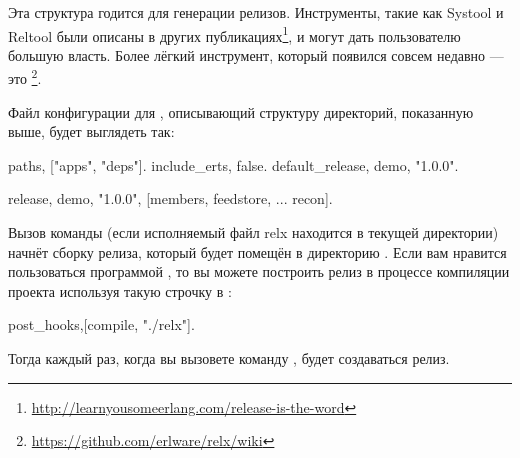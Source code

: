\documentclass[11pt, oneside]{book}   	%
\begin{document}
Эта структура годится для генерации релизов. Инструменты, такие как Systool и Reltool были описаны в других публикациях\footnote{\href{http://learnyousomeerlang.com/release-is-the-word}{http://learnyousomeerlang.com/release-is-the-word}}, и могут дать пользователю большую власть. Более лёгкий инструмент, который появился совсем недавно --- это \footnote{\href{https://github.com/erlware/relx/wiki}{https://github.com/erlware/relx/wiki}}.

Файл конфигурации для , описывающий структуру директорий, показанную выше, будет выглядеть так:

\begin{VerbatimText}
{paths, ["apps", "deps"]}.
{include_erts, false}. %
{default_release, demo, "1.0.0"}.

{release, {demo, "1.0.0"},
    [members,
     feedstore,
     ...
     recon]}.
\end{VerbatimText}

Вызов команды  (если исполняемый файл relx находится в текущей директории) начнёт сборку релиза, который будет помещён в директорию . Если вам нравится пользоваться программой , то вы можете построить релиз в процессе компиляции проекта используя такую строчку в :

\begin{VerbatimText}
{post_hooks,[{compile, "./relx"}]}.
\end{VerbatimText}

Тогда каждый раз, когда вы вызовете команду , будет создаваться релиз.
\end{document}
